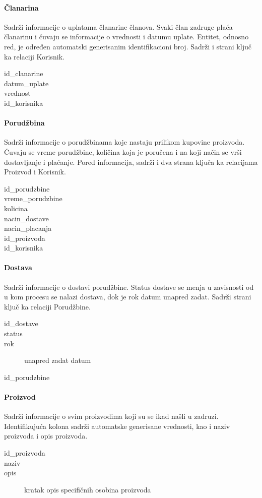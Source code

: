 \documentclass[a4paper, oneside]{article}
\begin{document}
\paragraph{Članarina} Sadrži informacije o uplatama članarine članova. Svaki član zadruge plaća članarinu i čuvaju se informacije o vrednosti i datumu uplate. Entitet, odnosno red, je određen automatski generisanim identifikacioni broj. Sadrži i strani ključ ka relaciji Korisnik.
\begin{description}
    \item[id\_clanarine]
    \item[datum\_uplate]
    \item[vrednost] 
    \item[id\_korisnika]
\end{description}
\paragraph{Porudžbina} Sadrži informacije o porudžbinama koje nastaju prilikom kupovine proizvoda. Čuvaju se vreme porudžbine, količina koja je poručena i na koji način se vrši dostavljanje i plaćanje. Pored informacija, sadrži i dva strana ključa ka relacijama Proizvod i Korisnik.
\begin{description}
    \item[id\_porudzbine]
    \item[vreme\_porudzbine]
    \item[kolicina]
    \item[nacin\_dostave]
    \item[nacin\_placanja]
    \item[id\_proizvoda]
    \item[id\_korisnika]
\end{description}
\paragraph{Dostava} Sadrži informacije o dostavi porudžbine. Status dostave se menja u zavisnosti od u kom procesu se nalazi dostava, dok je rok datum unapred zadat. Sadrži strani ključ ka relaciji Porudžbine.
\begin{description}
    \item[id\_dostave]
    \item[status]
    \item[rok] unapred zadat datum
    \item[id\_porudzbine]
\end{description}
\paragraph{Proizvod} Sadrži informacije o svim proizvodima koji su se ikad našli u zadruzi. Identifikujuća kolona sadrži automatske generisane vrednosti, kao i naziv proizvoda i opis proizvoda.
\begin{description}
    \item[id\_proizvoda]
    \item[naziv] 
    \item[opis] kratak opis specifičnih osobina proizvoda
\end{description}
\end{document}
